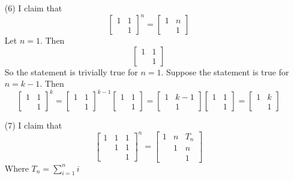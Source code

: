 \begin{itemize}
\item[(6)]
I claim that
$$\begin{bmatrix}
1 & 1 \\
& 1
\end{bmatrix}^n = \begin{bmatrix}
1 & n \\
& 1
\end{bmatrix}$$
Let $n = 1$. Then
$$\begin{bmatrix}
1 & 1 \\
& 1
\end{bmatrix}$$
So the statement is trivially true for $n = 1$. Suppose the statement is true for $n = k - 1$. Then
$$\begin{bmatrix}
1 & 1 \\
& 1
\end{bmatrix}^k = \begin{bmatrix}
1 & 1 \\
& 1
\end{bmatrix}^{k-1}\begin{bmatrix}
1 & 1 \\
& 1
\end{bmatrix} = \begin{bmatrix}
1 & k - 1 \\
& 1
\end{bmatrix}\begin{bmatrix}
1 & 1 \\
& 1
\end{bmatrix} = \begin{bmatrix}
1 & k \\
& 1
\end{bmatrix}$$
\item[(7)]
I claim that
$$\begin{bmatrix}
1 & 1 & 1 \\
& 1 & 1 \\
& & 1
\end{bmatrix}^n = \begin{bmatrix}
1 & n & T_n \\
& 1 & n \\
& & 1
\end{bmatrix}$$
Where $T_n = \sum_{i=1}^n i$


\end{itemize}
